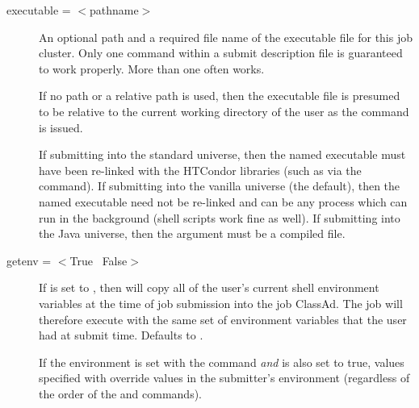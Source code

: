\begin{description}

\label{man-condor-submit-executable}
\item[executable = $<$pathname$>$]
An optional path and a required file name of the executable file for this
job cluster. Only one  command within a
submit description file is guaranteed to work properly.
More than one often works.

If no path or a relative path is used, then the executable file
is presumed to be relative
to the current working directory of the user as the
 command is issued.

If submitting into the standard universe, then the named executable
must have been re-linked with the HTCondor libraries (such as via the
 command). If submitting into the vanilla universe
(the default), then the named executable need not be re-linked and can
be any process which can run in the background (shell scripts work
fine as well).  If submitting into the Java universe, then the
argument must be a compiled  file.


\label{man-condor-submit-getenv}
\item[getenv = $<$True \Bar\ False$>$] 
If  is set to
, then  will copy all of the user's current
shell environment variables at the time of job submission into the job
ClassAd. The job will therefore execute with the same set of environment
variables that the user had at submit time. Defaults to .

If the environment is set with the  command \emph{and}
 is also set to true, values specified with
 override values in the submitter's environment
(regardless of the order of the  and 
commands).




\end{description}
